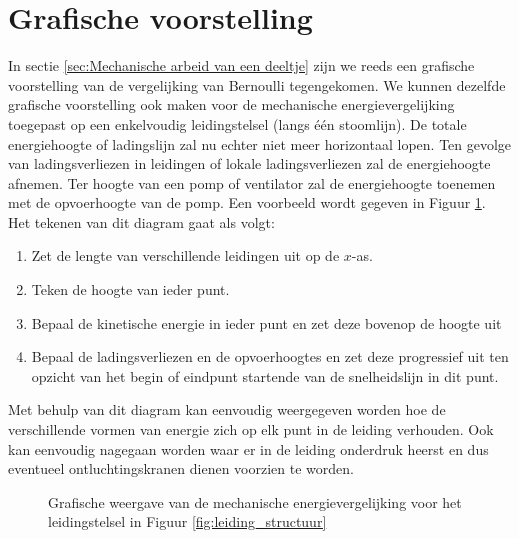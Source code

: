 		\section{Grafische voorstelling}
In sectie \ref{sec:Mechanische arbeid van een deeltje} zijn we reeds een grafische voorstelling van de vergelijking van Bernoulli tegengekomen. We kunnen dezelfde grafische voorstelling ook maken voor de mechanische energievergelijking toegepast op een enkelvoudig leidingstelsel (langs één stoomlijn). De totale energiehoogte of ladingslijn zal nu echter niet meer horizontaal lopen. Ten gevolge van ladingsverliezen in leidingen of lokale ladingsverliezen zal de energiehoogte afnemen. Ter hoogte van een pomp of ventilator zal de energiehoogte toenemen met de opvoerhoogte van de pomp. Een voorbeeld wordt gegeven in Figuur \ref{fig:leidingstelsel_energiehoogte}. Het tekenen van dit diagram gaat als volgt:
\begin{enumerate}
	\item Zet de lengte van verschillende leidingen uit op de $x$-as.
	\item Teken de hoogte van ieder punt.
	\item Bepaal de kinetische energie in ieder punt en zet deze bovenop de hoogte uit
	\item Bepaal de ladingsverliezen en de opvoerhoogtes en zet deze progressief uit ten opzicht van het begin of eindpunt startende van de snelheidslijn in dit punt.
\end{enumerate}
Met behulp van dit diagram kan eenvoudig weergegeven worden hoe de verschillende vormen van energie zich op elk punt in de leiding verhouden. Ook kan eenvoudig nagegaan worden waar er in de leiding onderdruk heerst en dus eventueel ontluchtingskranen dienen voorzien te worden.
\begin{figure}
	\centering
	
	\caption{Grafische weergave van de mechanische energievergelijking voor het leidingstelsel in Figuur \ref{fig:leiding_structuur}}
	\label{fig:leidingstelsel_energiehoogte}
\end{figure}


